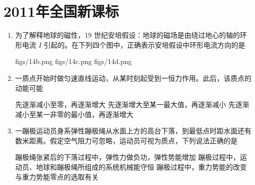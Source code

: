 \documentclass[\gkver]{gaokaozhenti}
\begin{document}
\chapter{2011年全国新课标}

\begin{enumerate}
\item
为了解释地球的磁性，19 世纪安培假设：地球的磁场是由绕过地心的轴的环形电流 $I$ 引起的。在下列四个图中，正确表示安培假设中环形电流方向的是

{figs/14b.png}
{figs/14c.png}
{figs/14d.png}


\item
一质点开始时做匀速直线运动，从某时刻起受到一恒力作用。此后，该质点的动能可能

{先逐渐减小至零，再逐渐增大}
{先逐渐增大至某一最大值，再逐渐减小}
{先逐渐减小至某一非零的最小值，再逐渐增大}


\item
一蹦极运动员身系弹性蹦极绳从水面上方的高台下落，到最低点时距水面还有数米距离。假定空气阻力可忽略，运动员可视为质点，下列说法正确的是

{蹦极绳张紧后的下落过程中，弹性力做负功，弹性势能增加}
{蹦极过程中，运动员、地球和蹦极绳所组成的系统机械能守恒}
{蹦极过程中，重力势能的改变与重力势能零点的选取有关}


\end{enumerate}
\end{document}
